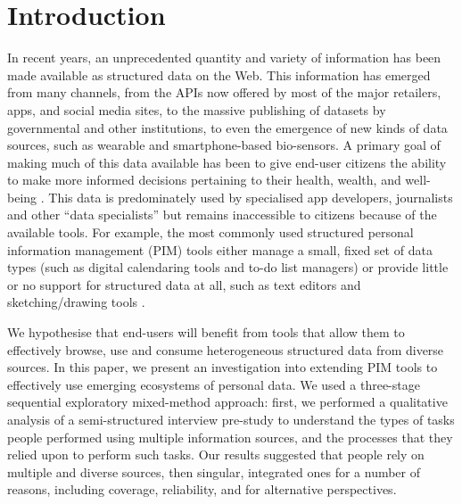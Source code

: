 \documentclass{sigchi}
\begin{document}



\section{Introduction}

In recent years, an unprecedented quantity and variety of information has been made available as structured data on the Web.  This information has emerged from many channels, from the APIs now offered by most of the major retailers, apps, and social media sites, to the massive publishing of datasets by governmental and other institutions, to even the emergence of new kinds of data sources, such as wearable and smartphone-based bio-sensors.  A primary goal of making much of this data available has been to give end-user citizens the ability to make more informed decisions pertaining to their health, wealth, and well-being \cite{Shadbolt:2006:SWR:1155313.1155373}.  This data is predominately used by specialised app developers, journalists and other ``data specialists'' but remains inaccessible to citizens because of the available tools.  For example, the most commonly used structured personal information management (PIM) tools either manage a small, fixed set of data types (such as digital calendaring tools and  to-do list managers) or provide little or no support for structured data at all, such as text editors and sketching/drawing tools \cite{infoscraps}.   

We hypothesise that end-users will benefit from tools that allow them to effectively browse, use and consume heterogeneous structured data from diverse sources. In this paper, we present an investigation into extending PIM tools to effectively use emerging ecosystems of personal data.  We used a three-stage sequential exploratory mixed-method approach: first, we performed a qualitative analysis of a semi-structured interview pre-study to understand the types of tasks people performed using multiple information sources, and the processes that they relied upon to perform such tasks.  Our results suggested that people rely on multiple and diverse sources, then singular, integrated ones for a number of reasons, including coverage, reliability, and for alternative perspectives.  
\end{document}
